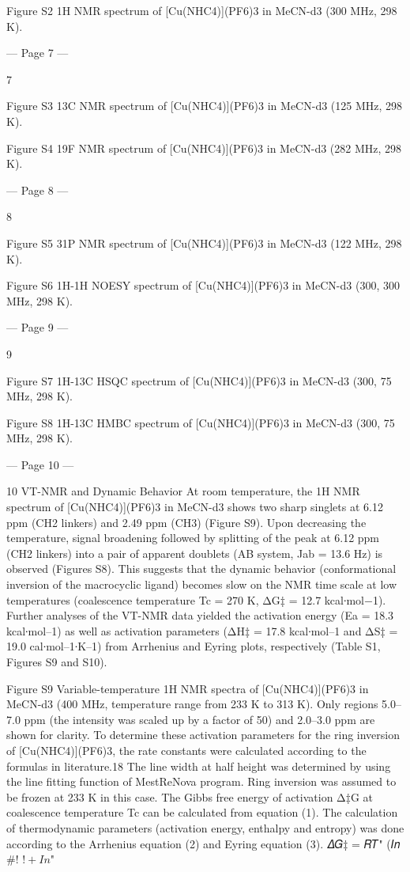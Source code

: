 Figure S2 1H NMR spectrum of [Cu(NHC4)](PF6)3 in MeCN-d3 (300 MHz, 298 K). 


--- Page 7 ---
 
7 
 
Figure S3 13C NMR spectrum of [Cu(NHC4)](PF6)3 in MeCN-d3 (125 MHz, 298 K). 
 
Figure S4 19F NMR spectrum of [Cu(NHC4)](PF6)3 in MeCN-d3 (282 MHz, 298 K). 


--- Page 8 ---
 
8 
 
Figure S5 31P NMR spectrum of [Cu(NHC4)](PF6)3 in MeCN-d3 (122 MHz, 298 K). 
 
Figure S6 1H-1H NOESY spectrum of [Cu(NHC4)](PF6)3 in MeCN-d3 (300, 300 MHz, 298 K). 


--- Page 9 ---
 
9 
 
Figure S7 1H-13C HSQC spectrum of [Cu(NHC4)](PF6)3 in MeCN-d3 (300, 75 MHz, 298 K). 
 
Figure S8 1H-13C HMBC spectrum of [Cu(NHC4)](PF6)3 in MeCN-d3 (300, 75 MHz, 298 K). 
 
 


--- Page 10 ---
 
10 
VT-NMR and Dynamic Behavior 
At room temperature, the 1H NMR spectrum of [Cu(NHC4)](PF6)3 in MeCN-d3 shows two sharp singlets at 
6.12 ppm (CH2 linkers) and 2.49 ppm (CH3) (Figure S9). Upon decreasing the temperature, signal broadening 
followed by splitting of the peak at 6.12 ppm (CH2 linkers) into a pair of apparent doublets (AB system, Jab = 13.6 
Hz) is observed (Figures S8). This suggests that the dynamic behavior (conformational inversion of the 
macrocyclic ligand) becomes slow on the NMR time scale at low temperatures (coalescence temperature Tc = 
270 K, ΔG‡ = 12.7 kcal∙mol−1). Further analyses of the VT-NMR data yielded the activation energy (Ea = 18.3 
kcal∙mol–1) as well as activation parameters (ΔH‡ = 17.8 kcal∙mol–1 and ΔS‡ = 19.0 cal∙mol–1∙K–1) from Arrhenius 
and Eyring plots, respectively (Table S1, Figures S9 and S10). 
 
Figure S9 Variable-temperature 1H NMR spectra of [Cu(NHC4)](PF6)3 in MeCN-d3 (400 MHz, temperature range 
from 233 K to 313 K). Only regions 5.0–7.0 ppm (the intensity was scaled up by a factor of 50) and 2.0–3.0 ppm 
are shown for clarity.  
To determine these activation parameters for the ring inversion of [Cu(NHC4)](PF6)3, the rate constants were 
calculated according to the formulas in literature.18 The line width at half height was determined by using the line 
fitting function of MestReNova program. Ring inversion was assumed to be frozen at 233 K in this case. The 
Gibbs free energy of activation Δ‡G at coalescence temperature Tc can be calculated from equation (1). The 
calculation of thermodynamic parameters (activation energy, enthalpy and entropy) was done according to the 
Arrhenius equation (2) and Eyring equation (3). 
𝛥𝐺‡ = 𝑅𝑇" (𝐼𝑛
#!
$! + 𝐼𝑛
$"


